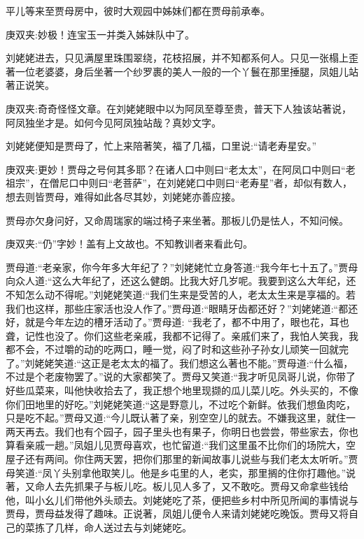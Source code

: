 \begin{parag}
    平儿等来至贾母房中，彼时大观园中姊妹们都在贾母前承奉。\begin{note}庚双夹:妙极！连宝玉一并类入姊妹队中了。\end{note}刘姥姥进去，只见满屋里珠围翠绕，花枝招展，并不知都系何人。只见一张榻上歪著一位老婆婆，身后坐著一个纱罗裹的美人一般的一个丫鬟在那里捶腿，凤姐儿站著正说笑。\begin{note}庚双夹:奇奇怪怪文章。在刘姥姥眼中以为阿凤至尊至贵，普天下人独该站著说，阿凤独坐才是。如何今见阿凤独站哉？真妙文字。\end{note}刘姥姥便知是贾母了，忙上来陪著笑，福了几福，口里说:“请老寿星安。”\begin{note}庚双夹:更妙！贾母之号何其多耶？在诸人口中则曰“老太太”，在阿凤口中则曰“老祖宗”，在僧尼口中则曰“老菩萨”，在刘姥姥口中则曰“老寿星”者，却似有数人，想去则皆贾母，难得如此各尽其妙，刘姥姥亦善应接。\end{note}贾母亦欠身问好，又命周瑞家的端过椅子来坐著。那板儿仍是怯人，不知问候。\begin{note}庚双夹:“仍”字妙！盖有上文故也。不知教训者来看此句。\end{note}贾母道:“老亲家，你今年多大年纪了？”刘姥姥忙立身答道:“我今年七十五了。”贾母向众人道:“这么大年纪了，还这么健朗。比我大好几岁呢。我要到这么大年纪，还不知怎么动不得呢。”刘姥姥笑道:“我们生来是受苦的人，老太太生来是享福的。若我们也这样，那些庄家活也没人作了。”贾母道:“眼睛牙齿都还好？”刘姥姥道:“都还好，就是今年左边的槽牙活动了。”贾母道: “我老了，都不中用了，眼也花，耳也聋，记性也没了。你们这些老亲戚，我都不记得了。亲戚们来了，我怕人笑我，我都不会，不过嚼的动的吃两口，睡一觉，闷了时和这些孙子孙女儿顽笑一回就完了。”刘姥姥笑道:“这正是老太太的福了。我们想这么著也不能。”贾母道:“什么福，不过是个老废物罢了。”说的大家都笑了。贾母又笑道:“我才听见凤哥儿说，你带了好些瓜菜来，叫他快收拾去了，我正想个地里现撷的瓜儿菜儿吃。外头买的，不像你们田地里的好吃。”刘姥姥笑道:“这是野意儿，不过吃个新鲜。依我们想鱼肉吃，只是吃不起。”贾母又道:“今儿既认著了亲，别空空儿的就去。不嫌我这里，就住一两天再去。我们也有个园子，园子里头也有果子，你明日也尝尝，带些家去，你也算看亲戚一趟。”凤姐儿见贾母喜欢，也忙留道:“我们这里虽不比你们的场院大，空屋子还有两间。你住两天罢，把你们那里的新闻故事儿说些与我们老太太听听。”贾母笑道:“凤丫头别拿他取笑儿。他是乡屯里的人，老实，那里搁的住你打趣他。”说著，又命人去先抓果子与板儿吃。板儿见人多了，又不敢吃。贾母又命拿些钱给他，叫小幺儿们带他外头顽去。刘姥姥吃了茶，便把些乡村中所见所闻的事情说与贾母，贾母益发得了趣味。正说著，凤姐儿便令人来请刘姥姥吃晚饭。贾母又将自己的菜拣了几样，命人送过去与刘姥姥吃。
\end{parag}


